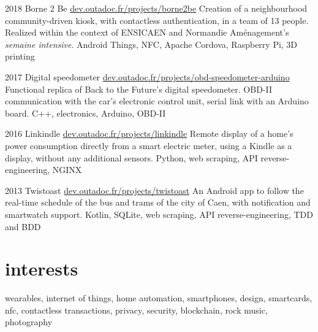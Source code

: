 \documentclass[]{friggeri-cv}
\begin{document}
\begin{entrylist}
    \entry
    {2018}
    {Borne 2 Be}
    {\href{https://dev.outadoc.fr/projects/borne2be}{dev.outadoc.fr/projects/borne2be}}
    {Creation of a neighbourhood community-driven kiosk, with contactless authentication, in a team of 13 people. Realized within the context of ENSICAEN and Normandie Aménagement's \textit{semaine intensive}.}
    {Android Things, NFC, Apache Cordova, Raspberry Pi, 3D printing}
    
    \entry
    {2017}
    {Digital speedometer}
    {\href{https://dev.outadoc.fr/projects/obd-speedometer-arduino}{dev.outadoc.fr/projects/obd-speedometer-arduino}}
    {Functional replica of Back to the Future's digital speedometer. OBD-II communication with the car's electronic control unit, serial link with an Arduino board.}
    {C++, electronics, Arduino, OBD-II}
    
    \entry
    {2016}
    {Linkindle}
    {\href{https://dev.outadoc.fr/projects/linkindle}{dev.outadoc.fr/projects/linkindle}}
    {Remote display of a home's power consumption directly from a smart electric meter, using a Kindle as a display, without any additional sensors.}
    {Python, web scraping, API reverse-engineering, NGINX}
    
    \entry
    {2013}
    {Twistoast}
    {\href{https://dev.outadoc.fr/projects/twistoast}{dev.outadoc.fr/projects/twistoast}}
    {An Android app to follow the real-time schedule of the bus and trams of the city of Caen, with notification and smartwatch support.}
    {Kotlin, SQLite, web scraping, API reverse-engineering, TDD and BDD}
\end{entrylist}

\section{interests}

wearables, internet of things, home automation, smartphones, design, smartcards, nfc, contactless transactions, privacy, security, blockchain, rock music, photography
\end{document}
